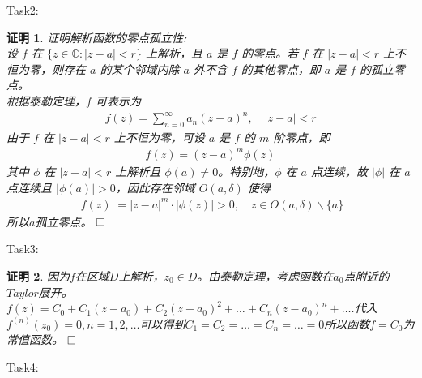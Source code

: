 \documentclass{ctexart}
\newcommand{\。}{．} %
\newenvironment{lanse}{
    \begin{tcolorbox}[breakable,enhanced, colback=qlan, boxrule=0pt, frame hidden,
        borderline west={0.7mm}{0.1mm}{slan}]
    }
    {\end{tcolorbox}}
\theoremstyle{t} %
\newtheorem*{zmhj}{\color{slan} 证明}
\newenvironment{zm}{\begin{lanse}\begin{zmhj}}{$\hfill \square$\end{zmhj}\end{lanse}}
\begin{document}
Task2:
\begin{zm}
    证明解析函数的零点孤立性:\\
    设 $f$ 在 $\{z\in\mathbb{C}:|z-a|<r\}$ 上解析，且 $a$ 是 $f$ 的零点。若 $f$ 在 $|z-a|<r$ 上不恒为零，则存在 $a$ 的某个邻域内除 $a$ 外不含 $f$ 的其他零点，即 $a$ 是 $f$ 的孤立零点。\\
    根据泰勒定理，$f$ 可表示为
    \begin{align*}
        f(z)=\sum_{n=0}^{\infty}a_n(z-a)^n,\quad |z-a|<r
    \end{align*}
    由于 $f$ 在 $|z-a|<r$ 上不恒为零，可设 $a$ 是 $f$ 的 $m$ 阶零点，即
    \begin{align*}
        f(z)=(z-a)^m\phi(z)
    \end{align*}
    其中 $\phi$ 在 $|z-a|<r$ 上解析且 $\phi(a)\neq 0$。特别地，$\phi$ 在 $a$ 点连续，故 $|\phi|$ 在 $a$ 点连续且 $|\phi(a)|>0$，因此存在邻域 $O(a,\delta)$ 使得
    \begin{align*}
        |f(z)|=|z-a|^m\cdot |\phi(z)|>0,\quad z\in O(a,\delta)\backslash \{a\}
    \end{align*}
    所以$a$孤立零点。
\end{zm}
Task3:
\begin{zm}
    因为$f$在区域$D$上解析，$z_0\in D$。由泰勒定理，考虑函数在$a_0$点附近的$Taylor$展开。$f(z)=C_0+C_1(z-a_0)+C_2(z-a_0)^2+\dots+C_n(z-a_0)^n+\dots$.代入$f^{(n)}(z_0)=0,n=1,2,\dots$可以得到$C_1=C_2=\dots=C_n=\dots=0$所以函数$f=C_0$为常值函数。
\end{zm}
Task4:
\end{document}
